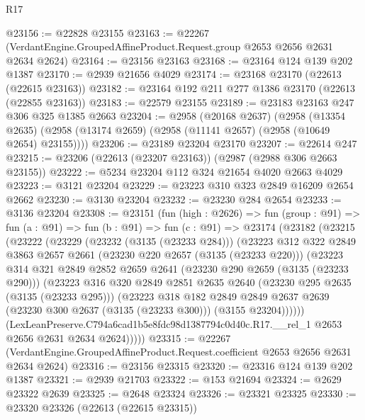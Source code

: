 \begin{lexlean}{R17}
\begin{coremodule}
@23156 := @22828 @23155
@23163 := @22267 (VerdantEngine.GroupedAffineProduct.Request.group @2653 @2656 @2631 @2634 @2624)
@23164 := @23156 @23163
@23168 := @23164 @124 @139 @202 @1387
@23170 := @2939 @21656 @4029
@23174 := @23168 @23170 (@22613 (@22615 @23163))
@23182 := @23164 @192 @211 @277 @1386 @23170 (@22613 (@22855 @23163))
@23183 := @22579 @23155
@23189 := @23183 @23163 @247 @306 @325 @1385 @2663
@23204 := @2958
    (@20168 @2637)
    (@2958
      (@13354 @2635)
      (@2958 (@13174 @2659) (@2958 (@11141 @2657) (@2958 (@10649 @2654) @23155))))
@23206 := @23189 @23204 @23170
@23207 := @22614 @247
@23215 := @23206 (@22613 (@23207 @23163)) (@2987 (@2988 @306 @2663 @23155))
@23222 := @5234 @23204 @112 @324 @21654 @4020 @2663 @4029
@23223 := @3121 @23204
@23229 := @23223 @310 @323 @2849 @16209 @2654 @2662
@23230 := @3130 @23204
@23232 := @23230 @284 @2654
@23233 := @3136 @23204
@23308 := @23151
    (fun (high : @2626) =>
    fun (group : @91) =>
    fun (a : @91) =>
    fun (b : @91) =>
    fun (c : @91) =>
    @23174
      (@23182
        (@23215
          (@23222
            (@23229
              (@23232 (@3135 (@23233 @284)))
              (@23223
                @312
                @322
                @2849
                @3863
                @2657
                @2661
                (@23230 @220 @2657 (@3135 (@23233 @220)))
                (@23223
                  @314
                  @321
                  @2849
                  @2852
                  @2659
                  @2641
                  (@23230 @290 @2659 (@3135 (@23233 @290)))
                  (@23223
                    @316
                    @320
                    @2849
                    @2851
                    @2635
                    @2640
                    (@23230 @295 @2635 (@3135 (@23233 @295)))
                    (@23223
                      @318
                      @182
                      @2849
                      @2849
                      @2637
                      @2639
                      (@23230 @300 @2637 (@3135 (@23233 @300)))
                      (@3155 @23204))))))
            (LexLeanPreserve.C794a6cad1b5e8fdc98d1387794c0d40c.R17.__rel_1
              @2653
              @2656
              @2631
              @2634
              @2624)))))
@23315 := @22267
    (VerdantEngine.GroupedAffineProduct.Request.coefficient @2653 @2656 @2631 @2634 @2624)
@23316 := @23156 @23315
@23320 := @23316 @124 @139 @202 @1387
@23321 := @2939 @21703
@23322 := @153 @21694
@23324 := @2629 @23322 @2639
@23325 := @2648 @23324
@23326 := @23321 @23325
@23330 := @23320 @23326 (@22613 (@22615 @23315))

\end{coremodule}
\end{lexlean}
